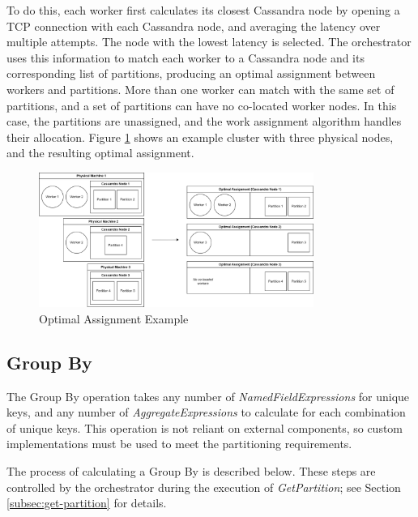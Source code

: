 To do this, each worker first calculates its closest Cassandra node by opening a TCP connection with each Cassandra node, and averaging the latency over multiple attempts. The node with the lowest latency is selected. The orchestrator uses this information to match each worker to a Cassandra node and its corresponding list of partitions, producing an optimal assignment between workers and partitions. More than one worker can match with the same set of partitions, and a set of partitions can have no co-located worker nodes. In this case, the partitions are unassigned, and the work assignment algorithm handles their allocation. Figure \ref{fig:optimal-assignment-example} shows an example cluster with three physical nodes, and the resulting optimal assignment.

\begin{figure}[h]
	\centering
	\includegraphics[width=0.8\textwidth]{chapters/diagrams/implementation/optimal-assignment-example}
	\caption{Optimal Assignment Example}
	\label{fig:optimal-assignment-example}
\end{figure}

\subsection{Group By}\label{subsec:group-by}
The Group By operation takes any number of \textit{NamedFieldExpressions} for unique keys, and any number of \textit{AggregateExpressions} to calculate for each combination of unique keys. This operation is not reliant on external components, so custom implementations must be used to meet the partitioning requirements.

The process of calculating a Group By is described below. These steps are  controlled by the orchestrator during the execution of \textit{GetPartition}; see Section \ref{subsec:get-partition} for details.

